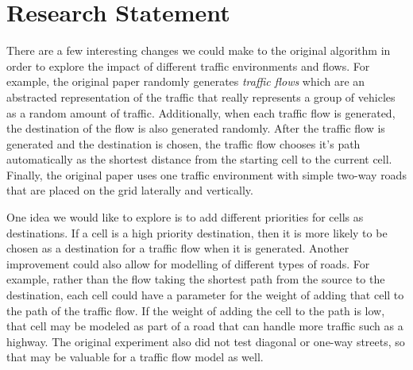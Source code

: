 \documentclass[sigplan,screen]{acmart}
\begin{document}

\maketitle

\section{Research Statement}
There are a few interesting changes we could make to the original algorithm in
order to explore the impact of different traffic environments and flows. For
example, the original paper randomly generates \textit{traffic flows} which are
an abstracted representation of the traffic that really represents a group of
vehicles as a random amount of traffic. Additionally, when each traffic flow is
generated, the destination of the flow is also generated randomly. After the
traffic flow is generated and the destination is chosen, the traffic flow
chooses it's path automatically as the shortest distance from the starting cell
to the current cell. Finally, the original paper uses one traffic environment
with simple two-way roads that are placed on the grid laterally and vertically.

One idea we would like to explore is to add different priorities for cells as
destinations. If a cell is a high priority destination, then it is more likely
to be chosen as a destination for a traffic flow when it is generated. Another
improvement could also allow for modelling of different types of roads. For
example, rather than the flow taking the shortest path from the source to the
destination, each cell could have a parameter for the weight of adding that cell
to the path of the traffic flow. If the weight of adding the cell to the path is
low, that cell may be modeled as part of a road that can handle more traffic
such as a highway. The original experiment also did not test diagonal or one-way
streets, so that may be valuable for a traffic flow model as well.
\end{document}
